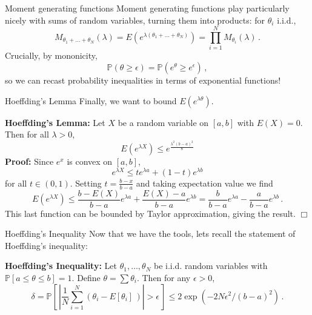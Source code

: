 \documentclass[10pt, table, handout]{beamer}
\newcommand{\bP}{\ensuremath{\mathbb{P}}}
\begin{document}
\begin{frame}[fragile]{Moment generating functions}
Moment generating functions play particularly nicely with sums of random variables, turning them into products: for $\theta_i$ i.i.d.,
\[
M_{\theta_1+\ldots+\theta_N}(\lambda) = E\left( e^{\lambda(\theta_1+\ldots+\theta_N)} \right) = \prod_{i=1}^N M_{\theta_i}(\lambda)\,.
\]
\pause Crucially, by mononicity,
$$
\bP(\theta\geq \epsilon) = \bP\left(e^\theta \geq e^\epsilon\right)\,,
$$
so we can recast probability inequalities in terms of exponential functions!

\end{frame}












\begin{frame}[fragile]{Hoeffding's Lemma}
Finally, we want to bound $E(e^{\lambda \theta})$.\newline

\textbf{Hoeffding's Lemma:} Let $X$ be a random variable on $[a,b]$ with $E(X)=0$. Then for all $\lambda>0$, 
$$
E(e^{\lambda X}) \leq e^{\frac{\lambda^2(b-a)^2 }8}
$$\pause
\textbf{Proof:} Since $e^x$ is convex on $[a,b]$, $$e^{\lambda X} \leq te^{\lambda a} + (1-t)e^{\lambda b} $$
for all $t\in(0,1)$. \pause Setting $t = \frac{b-x}{b-a}$ and taking expectation value we find
$$
E(e^{\lambda X})  \leq \frac{b-E(X)}{b-a}e^{\lambda a} + \frac{E(X)-a}{b-a}e^{\lambda b} = \frac{b}{b-a}e^{\lambda a} - \frac{a}{b-a}e^{\lambda b}\,.
$$
This last function can be bounded by Taylor approximation, giving the result. $\Box$

\end{frame}







\begin{frame}[fragile]{Hoeffding's Inequality}
Now that we have the tools, lets recall the statement of Hoeffding's inequality:

\textbf{Hoeffding's Inequality:} Let $\theta_1,\ldots, \theta_N$ be i.i.d. random variables with $\bP[a\leq \theta\leq b] = 1$. Define $\theta = \sum \theta_i$. Then for any $\epsilon>0$, 
$$
\delta = \bP\left[\, \left|\frac{1}{N} \sum_{i=1}^N(\theta_i - E[\theta_i]\,)\right|>\epsilon  \,\right]\leq 2\exp\left(-2N\epsilon^2/(b-a)^2\right)\,.
$$
\end{frame}
\end{document}
